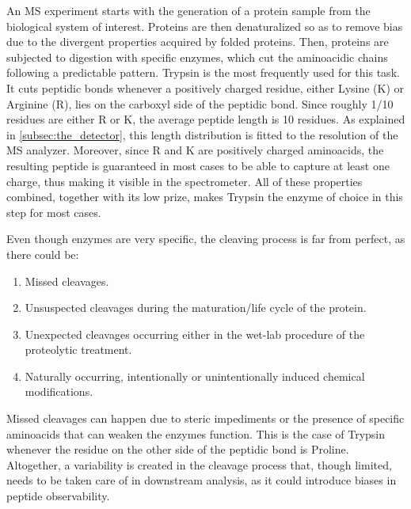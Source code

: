 \documentclass[11pt, a4paper]{report}
\begin{document}
An \ac{MS} experiment starts with the generation of a protein sample from the biological system of interest. Proteins are then denaturalized  so as to remove bias due to the divergent properties acquired by folded proteins. Then, proteins are subjected to digestion with specific enzymes, which cut the aminoacidic chains following a predictable pattern. Trypsin is the most frequently used for this task. It cuts peptidic bonds whenever a positively charged residue, either Lysine (K) or Arginine (R), lies on the carboxyl side of the peptidic bond. Since roughly 1/10 residues are either R or K, the average peptide length is 10 residues. As explained in \ref{subsec:the_detector}, this length distribution is fitted to the resolution of the MS analyzer. Moreover, since R and K are positively charged aminoacids, the resulting peptide is guaranteed in most cases to be able to capture at least one charge, thus making it visible in the spectrometer. All of these properties combined, together with its low prize, makes Trypsin the enzyme of choice in this step for most cases.

Even though enzymes are very specific, the cleaving process is far from perfect, as there could be: \cite{Barsnes2008}

\begin{enumerate}

\item Missed cleavages.

\item Unsuspected cleavages during the maturation/life cycle of the protein.

\item Unexpected cleavages occurring either in the wet-lab procedure of the proteolytic treatment.

\item Naturally occurring, intentionally or unintentionally induced chemical modifications.

\end{enumerate}


Missed cleavages can happen due to steric impediments or the presence of specific aminoacids that can weaken the enzyme\textquotesingle s function. This is the case of Trypsin whenever the residue on the other side of the peptidic bond is Proline. Altogether, a variability is created in the cleavage process that, though limited, needs to be taken care of in downstream analysis, as it could introduce biases in peptide observability. 
\end{document}
